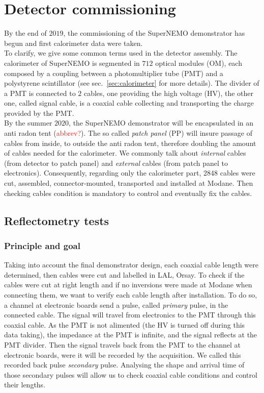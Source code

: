 \chapter{Detector commissioning}
\label{sec:commissioning}

By the end of $2019$, the commissioning of the SuperNEMO demonstrator has begun and first calorimeter data were taken.\\
To clarify, we give some common terms used in the detector assembly.
The calorimeter of SuperNEMO is segmented in $712$ optical modules (OM), each composed by a coupling between a photomultiplier tube (PMT) and a polystyrene scintillator (see sec.~\ref{sec:calorimeter} for more details).
The divider of a PMT is connected to $2$ cables, one providing the high voltage (HV), the other one, called signal cable, is a coaxial cable collecting and transporting the charge provided by the PMT.\\
By the summer $2020$, the SuperNEMO demonstrator will be encapsulated in an anti radon tent (\textcolor{red}{abbrev?}).
The so called \emph{patch panel} (PP) will insure passage of cables from inside, to outside the anti radon tent, therefore doubling the amount of cables needed for the calorimeter.
We commonly talk about \emph{internal} cables (from detector to patch panel) and \emph{external} cables (from patch panel to electronics).
Consequently, regarding only the calorimeter part, 2848 cables were cut, assembled, connector-mounted, transported and installed at Modane.
Then checking cables condition is mandatory to control and eventually fix the cables.

\section{Reflectometry tests}
\label{sec:reflecto}

\subsection{Principle and goal}

Taking into account the final demonstrator design, each coaxial cable length were determined, then cables were cut and labelled in LAL, Orsay.
To check if the cables were cut at right length and if no inversions were made at Modane when connecting them, we want to verify each cable length after installation.
To do so, a channel at electronic boards send a pulse, called \emph{primary} pulse, in the connected cable.
The signal will travel from electronics to the PMT through this coaxial cable.
As the PMT is not alimented (the HV is turned off during this data taking), the impedance at the PMT is infinite, and the signal reflects at the PMT divider.
Then the signal travels back from the PMT to the channel at electronic boards, were it will be recorded by the acquisition.
We called this recorded back pulse \emph{secondary} pulse.
Analysing the shape and arrival time of those secondary pulses will allow us to check coaxial cable conditions and control their lengths.


